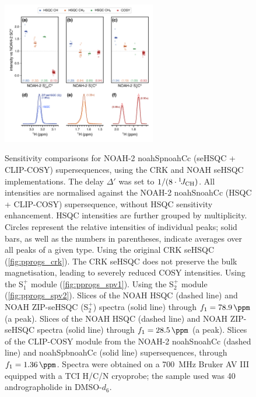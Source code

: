 \documentclass[11pt]{article}
\newcommand*{\noahtwo}[2]{\csname noah#1\endcsname\csname noah#2\endcsname}
\newcommand*{\noahSpa}{S$^+_1$}
\newcommand*{\noahSpb}{S$^+_2$}
\newcommand*{\onejch}{{}^{1}\!J_{\ce{CH}}}
\newcommand*{\andro}{Spectra were obtained on a \SI{700}{\MHz} Bruker AV III equipped with a TCI H/C/N cryoprobe; the sample used was \SI{40}{\milli\molar} andrographolide in DMSO-$d_6$.}
\begin{document}
\begin{figure}
    \centering
    \includegraphics[width=0.6\textwidth]{sehsqc_comp.png}
    {\label{fig:sehsqc_comp_crk}}
    {\label{fig:sehsqc_comp_spv1}}
    {\label{fig:sehsqc_comp_spv2}}
    {\label{fig:sehsqc_comp_ex_ch}}
    {\label{fig:sehsqc_comp_ex_ch2}}
    {\label{fig:sehsqc_comp_ex_cosy}}
    \caption{
        Sensitivity comparisons for NOAH-2 \noahtwo{Sp}{Cc} (seHSQC + CLIP-COSY) supersequences, using the CRK and NOAH seHSQC implementations.
        The delay $\Delta'$ was set to $1/(8\cdot\onejch)$.
        All intensities are normalised against the NOAH-2 \noahtwo{S}{Cc} (HSQC + CLIP-COSY) supersequence, without HSQC sensitivity enhancement.
        HSQC intensities are further grouped by multiplicity.
        Circles represent the relative intensities of individual peaks; solid bars, as well as the numbers in parentheses, indicate averages over all peaks of a given type.
        \textbf{} Using the original CRK seHSQC (\cref{fig:pprogs_crk}).
        The CRK seHSQC does not preserve the bulk magnetisation, leading to severely reduced COSY intensities.
        \textbf{} Using the \noahSpa{} module (\cref{fig:pprogs_spv1}).
        \textbf{} Using the \noahSpb{} module (\cref{fig:pprogs_spv2}).
        \textbf{} Slices of the NOAH HSQC (dashed line) and NOAH ZIP-seHSQC (\noahSpb{}) spectra (solid line) through $f_1 = \SI{78.9}{\ppm}$ (a  peak).
        \textbf{} Slices of the NOAH HSQC (dashed line) and NOAH ZIP-seHSQC spectra (solid line) through $f_1 = \SI{28.5}{\ppm}$ (a  peak).
        \textbf{} Slices of the CLIP-COSY module from the NOAH-2 \noahtwo{S}{Cc} (dashed line) and \noahtwo{Spb}{Cc} (solid line) supersequences, through $f_1 = \SI{1.36}{\ppm}$.
        \andro{}
    }
    \label{fig:sehsqc_comp}
\end{figure}
\end{document}
